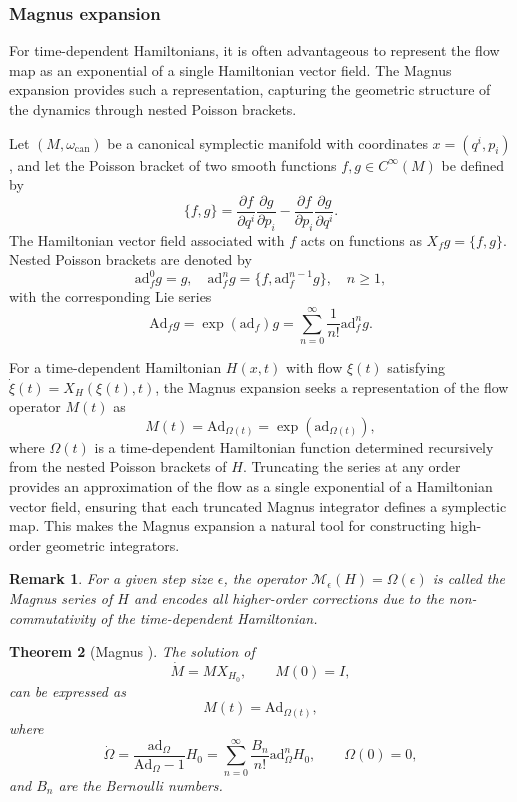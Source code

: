 \documentclass[12pt,english]{article}
\newtheorem{thm}{Theorem}[section]
\newtheorem{remark}[thm]{Remark}
\begin{document}
\subsubsection{Magnus expansion}

For time-dependent Hamiltonians, it is often advantageous to represent the flow map as an exponential of a single Hamiltonian vector field. The Magnus expansion \cite{BLANES2009151,Magnus1954,JAOteo_1991} provides such a representation, capturing the geometric structure of the dynamics through nested Poisson brackets.

Let $(M, \omega_\mathrm{can})$ be a canonical symplectic manifold with coordinates $x=(q^i,p_i)$, and let the Poisson bracket of two smooth functions $f,g \in C^\infty(M)$ be defined by
\[
\{f,g\} = \frac{\partial f}{\partial q^i}\frac{\partial g}{\partial p_i} - \frac{\partial f}{\partial p_i}\frac{\partial g}{\partial q^i}.
\]
The Hamiltonian vector field associated with $f$ acts on functions as $X_f g = \{f,g\}$. Nested Poisson brackets are denoted by
\[
\mathrm{ad}_f^0 g = g, \quad
\mathrm{ad}_f^n g = \{f, \mathrm{ad}_f^{n-1} g\}, \quad n\ge 1,
\]
with the corresponding Lie series
\[
\mathrm{Ad}_f g = \exp(\mathrm{ad}_f) g = \sum_{n=0}^\infty \frac{1}{n!} \mathrm{ad}_f^n g.
\]

For a time-dependent Hamiltonian $H(x,t)$ with flow $\xi(t)$ satisfying $\dot{\xi}(t) = X_H(\xi(t),t)$, the Magnus expansion seeks a representation of the flow operator $M(t)$ as
\[
M(t) = \mathrm{Ad}_{\Omega(t)} = \exp(\mathrm{ad}_{\Omega(t)}),
\]
where $\Omega(t)$ is a time-dependent Hamiltonian function determined recursively from the nested Poisson brackets of $H$. Truncating the series at any order provides an approximation of the flow as a single exponential of a Hamiltonian vector field, ensuring that each truncated Magnus integrator defines a symplectic map. This makes the Magnus expansion a natural tool for constructing high-order geometric integrators.

\begin{remark}
For a given step size $\epsilon$, the operator $\mathcal{M}_\epsilon(H) = \Omega(\epsilon)$ is called the \emph{Magnus series} of $H$ and encodes all higher-order corrections due to the non-commutativity of the time-dependent Hamiltonian.
\end{remark}

\begin{thm}[Magnus \cite{Magnus1954}]
The solution of
\[
\dot M = M X_{H_0}, \qquad M(0) = I,
\]
can be expressed as
\[
M(t) = \mathrm{Ad}_{\Omega(t)},
\]
where
\[
\dot\Omega = \frac{\mathrm{ad}_{\Omega}}{\mathrm{Ad}_{\Omega}-1} H_0 = \sum_{n=0}^{\infty} \frac{B_n}{n!} \mathrm{ad}_{\Omega}^n H_0, 
\qquad \Omega(0) = 0,
\]
and $B_n$ are the Bernoulli numbers.
\end{thm}
\end{document}
